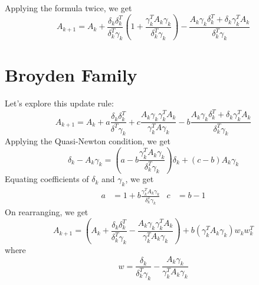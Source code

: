 Applying the formula twice, we get
\[ A_{k+1} = A_k + \frac{\delta_k\delta_k^T}{\delta_k^T\gamma_k}
\left( 1 + \frac{\gamma_k^TA_k\gamma_k}{\delta_k^T\gamma_k} \right)
- \frac{A_k\gamma_k\delta_k^T +  \delta_k\gamma_k^TA_k}{\delta_k^T\gamma_k} \]

\section{Broyden Family}

Let's explore this update rule:
\[ A_{k+1} = A_k + a\frac{\delta_k\delta_k^T}{\delta^T\gamma_k}
+ c\frac{A_k\gamma_k\gamma_k^TA_k}{\gamma_k^TA\gamma_k}
- b\frac{A_k\gamma_k\delta_k^T + \delta_k\gamma_k^TA_k}{\delta_k^T\gamma_k} \]
Applying the Quasi-Newton condition, we get
\[ \delta_k - A_k\gamma_k
= \left(a - b\frac{\gamma_k^TA_k\gamma_k}{\delta_k^T\gamma_k}\right)\delta_k + (c - b)A_k\gamma_k \]
Equating coefficients of $\delta_k$ and $\gamma_k$, we get
\begin{align*} a &= 1 + b\frac{\gamma_k^TA_k\gamma_k}{\delta_k^T\gamma_k} & c &= b-1 \end{align*}
On rearranging, we get
\[ A_{k+1} = \left( A_k + \frac{\delta_k\delta_k^T}{\delta_k^T\gamma_k}
- \frac{A_k\gamma_k\gamma_k^TA_k}{\gamma_k^TA_k\gamma_k} \right)
+ b(\gamma_k^TA_k\gamma_k)w_kw_k^T\]
where
\[ w = \frac{\delta_k}{\delta_k^T\gamma_k} - \frac{A_k\gamma_k}{\gamma_k^TA_k\gamma_k} \]


